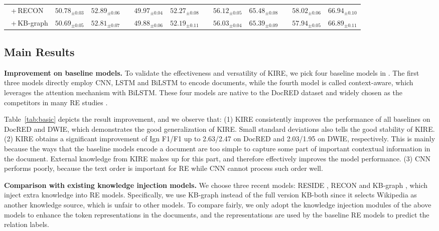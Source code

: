 \documentclass[runningheads]{llncs}
\begin{document}
\begin{table}[!tb]
{\begin{tabular}{l|ccccccccccc}
		\ +\,RECON       & $50.78_{\pm 0.03}$ & $52.89_{\pm 0.06}$ & & $49.97_{\pm 0.04}$ & $52.27_{\pm 0.08}$ & & $56.12_{\pm 0.05}$ & $65.48_{\pm 0.08}$ & & $58.02_{\pm 0.06}$ & $66.94_{\pm 0.10}$ \\
		\ +\,KB-graph    & $50.69_{\pm 0.05}$ & $52.81_{\pm 0.07}$ & & $49.88_{\pm 0.06}$ & $52.19_{\pm 0.11}$ & & $56.03_{\pm 0.04}$ & $65.39_{\pm 0.09}$ & & $57.94_{\pm 0.05}$ & $66.89_{\pm 0.11}$ \\
		\hline
	\end{tabular}}
\end{table}

\subsection{Main Results}
\label{subsect:main}

\textbf{Improvement on baseline models.}
To validate the effectiveness and versatility of KIRE, we pick four baseline models in \cite{yao2019docred}.
The first three models directly employ CNN, LSTM and BiLSTM to encode documents, while the fourth model is called context-aware, which leverages the attention mechanism with BiLSTM. 
These four models are native to the DocRED dataset and widely chosen as the competitors in many RE studies \cite{huang2021three,nan2020reasoning,tang2020hin,wang2020global,wang2019fine,xu2021entity,zeng2020double,zhou2021document}.

Table~\ref{tab:basic} depicts the result improvement, and we observe that: 
(1) KIRE consistently improves the performance of all baselines on DocRED and DWIE, which demonstrates the good generalization of KIRE. 
Small standard deviations also tells the good stability of KIRE.
(2) KIRE obtains a significant improvement of Ign F1/F1 up to 2.63/2.47 on DocRED and 2.03/1.95 on DWIE, respectively. 
This is mainly because the ways that the baseline models encode a document are too simple to capture some part of important contextual information in the document. 
External knowledge from KIRE makes up for this part, and therefore effectively improves the model performance.
(3) CNN performs poorly, because the text order is important for RE while CNN cannot process such order well. 

\textbf{Comparison with existing knowledge injection models.}
We choose three recent models: RESIDE \cite{vashishth2018reside}, RECON \cite{bastos2021recon} and KB-graph \cite{verlinden2021injecting}, which inject extra knowledge into RE models.
Specifically, we use KB-graph instead of the full version KB-both since it selects Wikipedia as another knowledge source, which is unfair to other models.
To compare fairly, we only adopt the knowledge injection modules of the above models to enhance the token representations in the documents, and the representations are used by the baseline RE models to predict the relation labels.
\end{document}
